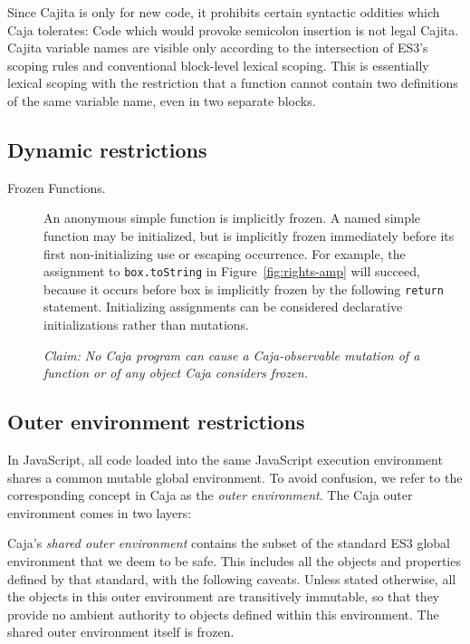 \documentclass[letterpaper,twocolumn,10pt]{article}
\newcommand{\code}[1]{{\tt {#1}}}              %
\begin{document}
\begin{description}
    Since Cajita is only for new code, it prohibits certain syntactic 
    oddities which Caja tolerates: Code which would provoke semicolon 
    insertion is not legal Cajita. Cajita variable names are visible only 
    according to the intersection of ES3's scoping rules and conventional 
    block-level lexical scoping. This is essentially lexical scoping with the 
    restriction that a function cannot contain two definitions of the same 
    variable name, even in two separate blocks.
        
\end{description}


\subsection{Dynamic restrictions}

\begin{description}

  \item[Frozen Functions.] An anonymous simple function is implicitly frozen. 
  A named simple function may be initialized, but is implicitly frozen 
  immediately before its first non-initializing use or escaping occurrence. 
  For example, the assignment to \code{box.toString} in 
  Figure~\ref{fig:rights-amp} will succeed, because it occurs before box is 
  implicitly frozen by the following \code{return} statement. Initializing 
  assignments can be considered declarative initializations rather than 
  mutations.
  
  \emph{Claim: No Caja program can cause a Caja-observable mutation of a 
  function or of any object Caja considers frozen.}
  
\end{description}
  
  
\subsection{Outer environment restrictions}

In JavaScript, all code loaded into the same JavaScript execution environment 
shares a common mutable global environment. To avoid confusion, we refer to 
the corresponding concept in Caja as the \emph{outer environment}. The Caja 
outer environment comes in two layers:

Caja's \emph{shared outer environment} contains the subset of the standard 
ES3 global environment that we deem to be safe. This includes all the objects 
and properties defined by that standard, with the following caveats. Unless 
stated otherwise, all the objects in this outer environment are transitively 
immutable, so that they provide no ambient authority to objects defined 
within this environment. The shared outer environment itself is frozen.
\end{document}
